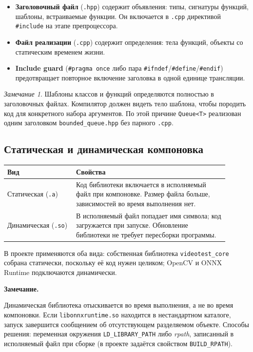 \documentclass[11pt,a4paper]{article}
\theoremstyle{definition}
\theoremstyle{remark}
\newtheorem*{remark}{Замечание}
\newenvironment{note}
  {\par\medskip\noindent
   \begin{lrbox}{\notebox}%
   \begin{minipage}{0.93\linewidth}%
   \small\textbf{Замечание.}\par\vspace{1pt}\noindent\ignorespaces}
  {\end{minipage}%
   \end{lrbox}%
   \fboxsep=6pt\relax
   \colorbox{codebg}{\usebox{\notebox}}%
   \par\medskip}
\begin{document}
\begin{itemize}
  \item \textbf{Заголовочный файл} (\texttt{.hpp}) содержит объявления: типы,
        сигнатуры функций, шаблоны, встраиваемые функции. Он включается в
        \texttt{.cpp} директивой \texttt{\#include} на этапе препроцессора.
  \item \textbf{Файл реализации} (\texttt{.cpp}) содержит определения: тела
        функций, объекты со статическим временем жизни.
  \item \textbf{Include guard} (\texttt{\#pragma once} либо пара
        \texttt{\#ifndef}/\texttt{\#define}/\texttt{\#endif}) предотвращает
        повторное включение заголовка в одной единице трансляции.
\end{itemize}

\begin{remark}
Шаблоны классов и функций определяются полностью в заголовочных файлах.
Компилятор должен видеть тело шаблона, чтобы породить код для конкретного
набора аргументов. По этой причине \texttt{Queue<T>} реализован одним
заголовком \texttt{bounded\_queue.hpp} без парного \texttt{.cpp}.
\end{remark}

\subsection{Статическая и динамическая компоновка}

\begin{center}
\begin{tabular}{p{0.28\linewidth}p{0.62\linewidth}}
\toprule
Вид & Свойства \\
\midrule
Статическая (\texttt{.a}) & Код библиотеки включается в исполняемый файл при
компоновке. Размер файла больше, зависимостей во время выполнения нет. \\
Динамическая (\texttt{.so}) & В исполняемый файл попадает имя символа; код
загружается при запуске. Обновление библиотеки не требует пересборки
программы. \\
\bottomrule
\end{tabular}
\end{center}

В проекте применяются оба вида: собственная библиотека
\texttt{videotest\_core} собрана статически, поскольку её код нужен целиком;
OpenCV и ONNX Runtime подключаются динамически.

\begin{note}
Динамическая библиотека отыскивается во время выполнения, а не во время
компоновки. Если \texttt{libonnxruntime.so} находится в нестандартном
каталоге, запуск завершится сообщением об отсутствующем разделяемом объекте.
Способы решения: переменная окружения \texttt{LD\_LIBRARY\_PATH} либо
\emph{rpath}, записанный в исполняемый файл при сборке (в проекте задаётся
свойством \texttt{BUILD\_RPATH}).
\end{note}
\end{document}
